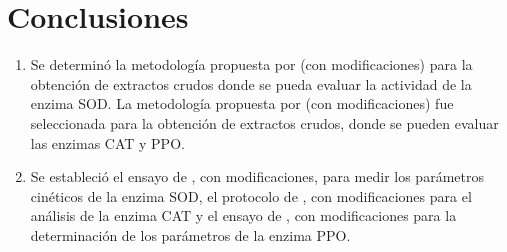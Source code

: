 
\chapter{Conclusiones}


\begin{enumerate}
\item Se determin\'o la metodolog\'ia propuesta por \cite{baquero2005catalase} (con modificaciones) para la obtenci\'on de extractos crudos donde se pueda evaluar la actividad de la enzima SOD. La metodolog\'ia propuesta por \cite{liu2010exogenous} (con modificaciones) fue seleccionada para la obtenci\'on de extractos crudos, donde se pueden evaluar las enzimas CAT y PPO.\\
\item Se estableci\'o el ensayo de \cite{ma2009spectroscopic}, con modificaciones, para medir los par\'ametros cin\'eticos de la enzima SOD, el protocolo de \citep{chance1955136}, con modificaciones para el an\'alisis de la enzima CAT y el ensayo de \cite{baquero2005catalase}, con modificaciones para la determinaci\'on de los par\'ametros de la enzima PPO.

\end{enumerate}


